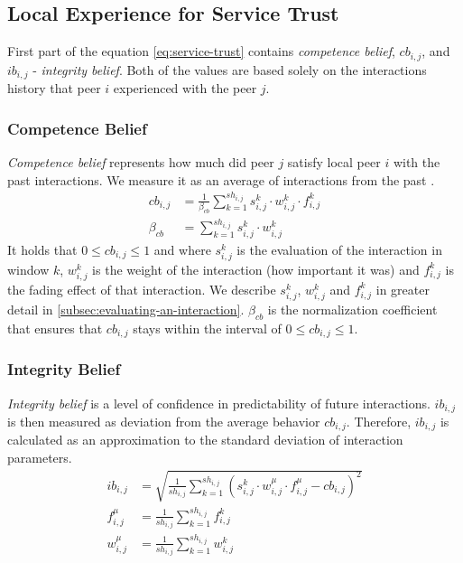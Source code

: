 \subsection{Local Experience for Service Trust}
First part of the equation \ref{eq:service-trust} contains \textit{competence belief}, $cb_{i,j}$, and $ib_{i,j}$ - \textit{integrity belief}.
Both of the values are based solely on the interactions history that peer $i$ experienced with the peer $j$.

\subsubsection{Competence Belief}
\textit{Competence belief} represents how much did peer $j$ satisfy local peer $i$ with the past interactions. We measure it as an average of interactions from the past \cite{sort}.
\begin{equation}
\begin{split}
    cb_{i,j} &= \frac{1}{\beta_{cb}} \sum_{k=1}^{sh_{i, j}} s_{i,j}^{k} \cdot w_{i,j}^{k} \cdot f_{i,j}^{k} \\
    \beta_{cb} &= \sum_{k=1}^{sh_{i, j}} s_{i,j}^{k} \cdot w_{i,j}^{k}
\end{split}
\end{equation}
It holds that $0 \leq cb_{i,j} \leq 1$ and where $s^{k}_{i,j}$ is the evaluation of the interaction in window $k$, $w^{k}_{i, j}$ is the weight of the interaction (how important it was) and $f^{k}_{i,j}$ is the fading effect of that interaction. We describe $s^{k}_{i,j}$, $w^{k}_{i,j}$ and $f^{k}_{i,j}$ in greater detail in \ref{subsec:evaluating-an-interaction}. 
$\beta_{cb}$ is the normalization coefficient that ensures that $cb_{i, j}$ stays within the interval of $0 \leq cb_{i,j} \leq 1$.

\subsubsection{Integrity Belief}
\textit{Integrity belief} is a level of confidence in predictability of future interactions. $ib_{i,j}$ is then measured as deviation from the average behavior $cb_{i,j}$. 
Therefore, $ib_{i,j}$ is calculated as an approximation to the standard deviation of interaction parameters\cite{sort}.
\begin{equation}
\begin{split}
    ib_{i,j} &= \sqrt{\frac{1}{sh_{i,j}} \sum_{k=1}^{sh_{i,j}}\left(s_{i,j}^{k} \cdot w_{i,j}^{\mu} \cdot f_{i,j}^{\mu} - cb_{i,j}\right)^{2}} \\
    f_{i,j}^{\mu} &= \frac{1}{sh_{i, j}} \sum_{k=1}^{sh_{i,j}} f^{k}_{i,j} \\
    w_{i,j}^{\mu} &= \frac{1}{sh_{i, j}} \sum_{k=1}^{sh_{i,j}} w^{k}_{i,j}
\end{split}
\end{equation}

